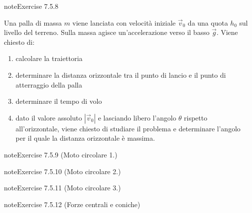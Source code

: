 \documentclass[letterpaper,10pt,italian]{jupyterBook}
\begin{document}
\begin{sphinxadmonition}{note}{Exercise 7.5.8}



\sphinxAtStartPar
Una palla di massa \(m\) viene lanciata con velocità iniziale \(\vec{v}_0\) da una quota \(h_0\) sul livello del terreno. Sulla massa agisce un’accelerazione verso il basso \(\vec{g}\). Viene chiesto di:
\begin{enumerate}
%
\item {} 
\sphinxAtStartPar
calcolare la traiettoria

\item {} 
\sphinxAtStartPar
determinare la distanza orizzontale tra il punto di lancio e il punto di atterraggio della palla

\item {} 
\sphinxAtStartPar
determinare il tempo di volo

\item {} 
\sphinxAtStartPar
dato il valore assoluto \(|\vec{v}_0|\) e lasciando libero l’angolo \(\theta\) rispetto all’orizzontale, viene chiesto di studiare il problema e determinare l’angolo per il quale la distanza orizzontale è massima.

\end{enumerate}
\end{sphinxadmonition}
 \label{exercise:ch/mechanics/kinematics-problems-exercise-8}

\begin{sphinxadmonition}{note}{Exercise 7.5.9 (Moto circolare 1.)}


\end{sphinxadmonition}
 \label{exercise:ch/mechanics/kinematics-problems-exercise-9}

\begin{sphinxadmonition}{note}{Exercise 7.5.10 (Moto circolare 2.)}


\end{sphinxadmonition}
 \label{exercise:ch/mechanics/kinematics-problems-exercise-10}

\begin{sphinxadmonition}{note}{Exercise 7.5.11 (Moto circolare 3.)}


\end{sphinxadmonition}
 \label{exercise:ch/mechanics/kinematics-problems-exercise-11}

\begin{sphinxadmonition}{note}{Exercise 7.5.12 (Forze centrali e coniche)}


\end{sphinxadmonition}
 \label{exercise:ch/mechanics/kinematics-problems-exercise-12}
\end{document}
